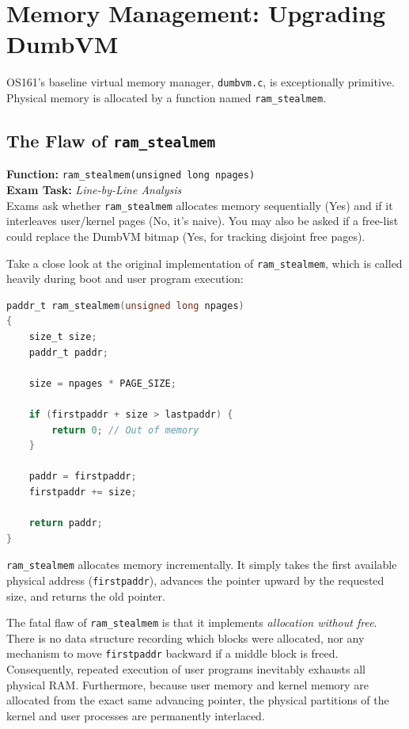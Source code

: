 \section{Memory Management: Upgrading DumbVM}
OS161's baseline virtual memory manager, \texttt{dumbvm.c}, is exceptionally primitive. Physical memory is allocated by a function named \texttt{ram\_stealmem}.

\subsection{The Flaw of \texttt{ram\_stealmem}}

\begin{tcolorbox}[colback=red!5!white, colframe=red!75!black, title=\textbf{! EXAM FOCUS: IMPLEMENTATION REQUIRED}]
\textbf{Function:} \texttt{ram\_stealmem(unsigned long npages)} \\
\textbf{Exam Task:} \textit{Line-by-Line Analysis} \\
Exams ask whether \texttt{ram\_stealmem} allocates memory sequentially (Yes) and if it interleaves user/kernel pages (No, it's naive). You may also be asked if a free-list could replace the DumbVM bitmap (Yes, for tracking disjoint free pages).
\end{tcolorbox}

Take a close look at the original implementation of \texttt{ram\_stealmem}, which is called heavily during boot and user program execution:
\begin{lstlisting}[language=C]
paddr_t ram_stealmem(unsigned long npages)
{
	size_t size;
	paddr_t paddr;

	size = npages * PAGE_SIZE;

	if (firstpaddr + size > lastpaddr) {
		return 0; // Out of memory
	}

	paddr = firstpaddr;
	firstpaddr += size;

	return paddr;
}
\end{lstlisting}

\texttt{ram\_stealmem} allocates memory incrementally. It simply takes the first available physical address (\texttt{firstpaddr}), advances the pointer upward by the requested size, and returns the old pointer. 

The fatal flaw of \texttt{ram\_stealmem} is that it implements \textit{allocation without free}. There is no data structure recording which blocks were allocated, nor any mechanism to move \texttt{firstpaddr} backward if a middle block is freed. Consequently, repeated execution of user programs inevitably exhausts all physical RAM. Furthermore, because user memory and kernel memory are allocated from the exact same advancing pointer, the physical partitions of the kernel and user processes are permanently interlaced.

